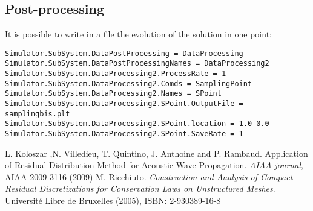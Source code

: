 \documentclass[11pt]{article}
\begin{document}
\subsection{Post-processing}
It is possible to write in a file the evolution of the solution in one point:
\begin{verbatim}
Simulator.SubSystem.DataPostProcessing = DataProcessing
Simulator.SubSystem.DataPostProcessingNames = DataProcessing2
Simulator.SubSystem.DataProcessing2.ProcessRate = 1
Simulator.SubSystem.DataProcessing2.Comds = SamplingPoint
Simulator.SubSystem.DataProcessing2.Names = SPoint
Simulator.SubSystem.DataProcessing2.SPoint.OutputFile = samplingbis.plt
Simulator.SubSystem.DataProcessing2.SPoint.location = 1.0 0.0
Simulator.SubSystem.DataProcessing2.SPoint.SaveRate = 1
\end{verbatim}



\begin{thebibliography}{02}
 L. Koloszar ,N. Villedieu, T. Quintino, J. Anthoine and P. Rambaud. Application of Residual Distribution Method for Acoustic Wave Propagation.
{\emph{AIAA journal}}, AIAA 2009-3116 (2009)
 M. Ricchiuto. {\emph{Construction and Analysis of Compact Residual Discretizations for Conservation Laws on Unstructured Meshes}}. Universit{\'e} Libre de Bruxelles (2005),
ISBN: 2-930389-16-8
\end{thebibliography}
\end{document}
